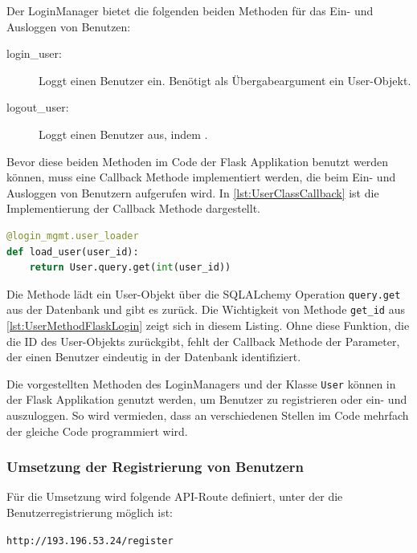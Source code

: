 \documentclass[a4paper,titlepage,halfparskip,12pt]{scrreprt}
\begin{document}
\begin{onehalfspacing}
Der LoginManager bietet die folgenden beiden Methoden für das Ein- und Ausloggen von Benutzen:

\begin{description}
\item[login\_user:] Loggt einen Benutzer ein. Benötigt als Übergabeargument ein User-Objekt.
\item[logout\_user:] Loggt einen Benutzer aus, indem .
\end{description}

Bevor diese beiden Methoden im Code der Flask Applikation benutzt werden können, muss eine Callback Methode implementiert werden, die beim Ein- und Ausloggen von Benutzern aufgerufen wird. In \autoref{lst:UserClassCallback} ist die Implementierung der Callback Methode dargestellt.

\begin{lstlisting}[language=python, caption={Callback Methode für das Modul flask\_login}, label={lst:UserClassCallback}]
@login_mgmt.user_loader
def load_user(user_id):
    return User.query.get(int(user_id))
\end{lstlisting}

Die Methode lädt ein User-Objekt über die SQLALchemy Operation \texttt{query.get} aus der Datenbank und gibt es zurück. Die Wichtigkeit von Methode \texttt{get\_id} aus \autoref{lst:UserMethodFlaskLogin} zeigt sich in diesem Listing. Ohne diese Funktion, die die ID des User-Objekts zurückgibt, fehlt der Callback Methode der Parameter, der einen Benutzer eindeutig in der Datenbank identifiziert.\cite{flaskLogin}

Die vorgestellten Methoden des LoginManagers und der Klasse \texttt{User} können in der Flask Applikation genutzt werden, um Benutzer zu registrieren oder ein- und auszuloggen. So wird vermieden, dass an verschiedenen Stellen im Code mehrfach der gleiche Code programmiert wird.

\subsubsection*{Umsetzung der Registrierung von Benutzern}

Für die Umsetzung wird folgende \acs{API}-Route definiert, unter der die Benutzerregistrierung möglich ist:

\texttt{http://193.196.53.24/register}


\end{onehalfspacing}
\end{document}
